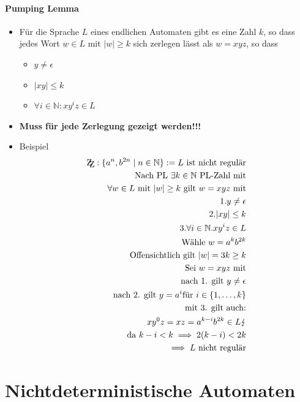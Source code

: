 \documentclass{scrartcl}
\begin{document}
\paragraph{Pumping Lemma}

\begin{itemize}
	\item Für die Sprache $L$ eines endlichen Automaten gibt es eine Zahl $k$, so dass jedes Wort $w \in L$ mit $|w| \geq k$ sich zerlegen lässt als $w = xyz$, so dass
	\begin{itemize}
		\item $y \neq \epsilon$
		\item $|xy| \leq k$
		\item $\forall i \in \mathbb{N}: xy^iz \in L$
	\end{itemize}
	\item \textbf{Muss für jede Zerlegung gezeigt werden!!!}
	\item Beispiel
	\begin{align*}
		\mathrm{Z\kern-.3em\raise-0.5ex\hbox{Z}}: \{ a^n,b^{2n} \mid n \in \mathbb{N} \} := L \text{ ist nicht regulär} \\
		\text{Nach PL } \exists k \in \mathbb{N} \text{ PL-Zahl mit} \\
		\forall w \in L \text{ mit } |w| \geq k \text{ gilt } w = xyz \text{ mit} \\
		1. y \neq \epsilon \\
		2. |xy| \leq k \\
		3. \forall i \in \mathbb{N}. xy^iz \in L \\
		\text{Wähle } w = a^kb^{2k} \\
		\text{Offensichtlich gilt } |w| = 3k \geq k \\
		\text{Sei } w = xyz \text{ mit} \\
		\text{nach 1. gilt } y \neq \epsilon \\
		\text{nach 2. gilt } y = a^i \text{für } i \in \{ 1,\ldots,k \} \\
		\text{mit 3. gilt auch:} \\
		xy^0z = xz = a^{k-i}b^{2k} \in L \lightning \\
		\text{da } k-i < k \implies 2(k - i) < 2k \\
		\implies L \text{ nicht regulär}
	\end{align*}
\end{itemize}

\pagebreak
\section{Nichtdeterministische Automaten}
\end{document}
